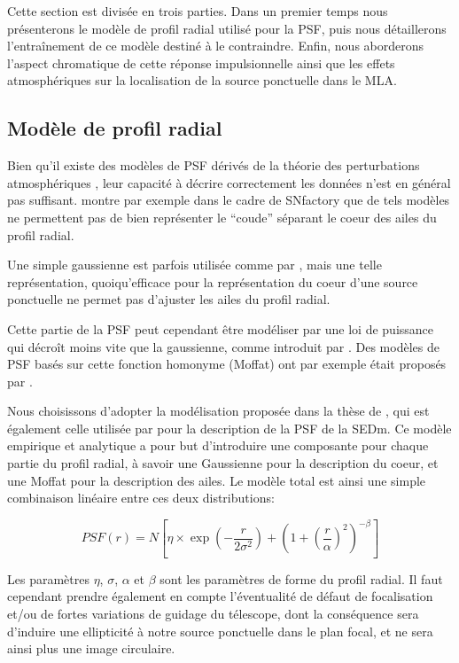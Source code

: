 \documentclass[../main/main.tex]{subfiles}
\begin{document}
Cette section est divisée en trois parties. Dans un premier temps nous
présenterons le modèle de profil radial utilisé pour la PSF, puis nous
détaillerons l'entraînement de ce modèle destiné à le contraindre. Enfin,
nous aborderons l'aspect chromatique de cette réponse
impulsionnelle ainsi que les effets atmosphériques sur la localisation de la
source ponctuelle dans le MLA.


\subsection{Modèle de profil radial}\label{ssec:radialpsf}

Bien qu'il existe des modèles de PSF dérivés de la théorie des
perturbations atmosphériques \citep{Kolmogorov, Fried1966,Tokovinin},
leur capacité à décrire correctement les données n'est en général pas
suffisant. \citet{Butonthese} montre par exemple dans le cadre de
SNfactory que de tels modèles ne
permettent pas de bien représenter le ``coude'' séparant le coeur des ailes du profil radial.

Une simple gaussienne est parfois utilisée comme par \citet{King1971},
mais une telle représentation, quoiqu'efficace pour la représentation du
coeur d'une source ponctuelle ne permet pas d'ajuster les ailes du
profil radial.

Cette partie de la PSF peut cependant être modéliser par une
loi de puissance qui décroît moins vite que la gaussienne, comme
introduit par \citet{Moffat1969}. Des modèles de PSF basés sur cette
fonction homonyme (Moffat) ont par exemple était proposés par
\citet{Racine1996, Trujillo2001}.

Nous choisissons d'adopter la modélisation proposée dans la thèse de
\citet{Butonthese}, qui est également celle utilisée par \citet{pysedm}
pour la description de la PSF de la SEDm. Ce modèle empirique et
analytique a pour but d'introduire une composante pour chaque partie du
profil radial, à savoir une Gaussienne pour la description du coeur, et
une Moffat pour la description des ailes. Le modèle total est ainsi une
simple combinaison linéaire entre ces deux distributions:

\begin{equation}
  \label{eq:psfmodel}
  PSF(r) = N\left[\eta\times\exp\left(- \frac{r}{2\sigma^{2}}\right) +
    \left( 1+\left( \frac{r}{\alpha}\right)^{2}\right)^{-\beta} \right]
\end{equation}

Les paramètres $\eta$, $\sigma$, $\alpha$ et $\beta$ sont les paramètres
de forme du profil radial. Il faut cependant prendre également en compte
l'éventualité de défaut de focalisation et/ou de fortes variations de guidage du télescope, dont la conséquence sera
d'induire une ellipticité à notre source ponctuelle dans le plan focal,
et ne sera ainsi plus une image circulaire.
\end{document}
